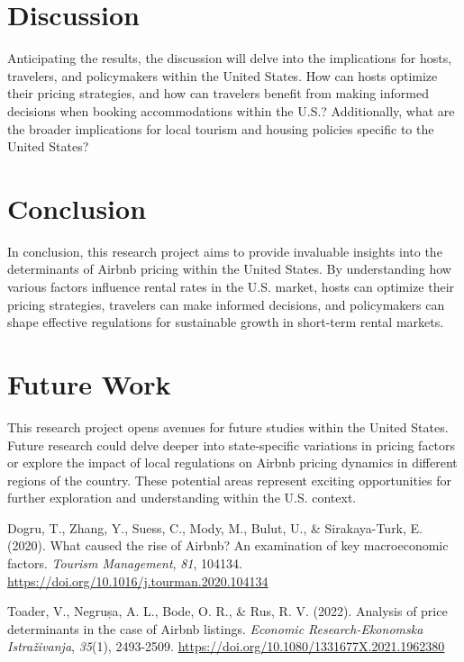 \documentclass[12pt, letterpaper]{article}
\begin{document}
\section*{Discussion}
Anticipating the results, the discussion will delve into the implications for hosts, travelers, and policymakers within the United States. How can hosts optimize their pricing strategies, and how can travelers benefit from making informed decisions when booking accommodations within the U.S.? Additionally, what are the broader implications for local tourism and housing policies specific to the United States?

\section*{Conclusion}
In conclusion, this research project aims to provide invaluable insights into the determinants of Airbnb pricing within the United States. By understanding how various factors influence rental rates in the U.S. market, hosts can optimize their pricing strategies, travelers can make informed decisions, and policymakers can shape effective regulations for sustainable growth in short-term rental markets.

\section*{Future Work}
This research project opens avenues for future studies within the United States. Future research could delve deeper into state-specific variations in pricing factors or explore the impact of local regulations on Airbnb pricing dynamics in different regions of the country. These potential areas represent exciting opportunities for further exploration and understanding within the U.S. context.

\begin{thebibliography}{}

Dogru, T., Zhang, Y., Suess, C., Mody, M., Bulut, U., \& Sirakaya-Turk, E. (2020). What caused the rise of Airbnb? An examination of key macroeconomic factors. \textit{Tourism Management}, \textit{81}, 104134. \url{https://doi.org/10.1016/j.tourman.2020.104134}

Toader, V., Negrușa, A. L., Bode, O. R., \& Rus, R. V. (2022). Analysis of price determinants in the case of Airbnb listings. \textit{Economic Research-Ekonomska Istraživanja}, \textit{35}(1), 2493-2509. \url{https://doi.org/10.1080/1331677X.2021.1962380}

\end{thebibliography}
\end{document}
